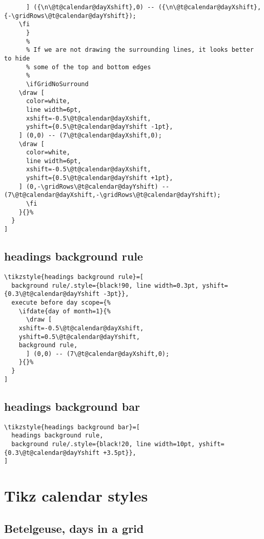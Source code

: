 \documentclass[11pt,oneside]{memoir-article}
\begin{document}
\begin{verbatim}
	  ] ({\n\@t@calendar@dayXshift},0) -- ({\n\@t@calendar@dayXshift},{-\gridRows\@t@calendar@dayYshift});
	\fi
      }
      %
      % If we are not drawing the surrounding lines, it looks better to hide
      % some of the top and bottom edges
      %
      \ifGridNoSurround
	\draw [
	  color=white,
	  line width=6pt,
	  xshift=-0.5\@t@calendar@dayXshift,
	  yshift={0.5\@t@calendar@dayYshift -1pt},
	] (0,0) -- (7\@t@calendar@dayXshift,0);
	\draw [
	  color=white,
	  line width=6pt,
	  xshift=-0.5\@t@calendar@dayXshift,
	  yshift={0.5\@t@calendar@dayYshift +1pt},
	] (0,-\gridRows\@t@calendar@dayYshift) -- (7\@t@calendar@dayXshift,-\gridRows\@t@calendar@dayYshift);
      \fi
    }{}%
  }
]
\end{verbatim}

\subsection{headings background rule}
\label{sec:orgb2f8132}

\begin{verbatim}
\tikzstyle{headings background rule}=[
  background rule/.style={black!90, line width=0.3pt, yshift={0.3\@t@calendar@dayYshift -3pt}},
  execute before day scope={%
    \ifdate{day of month=1}{%
      \draw [
	xshift=-0.5\@t@calendar@dayXshift,
	yshift=0.5\@t@calendar@dayYshift,
	background rule,
      ] (0,0) -- (7\@t@calendar@dayXshift,0);
    }{}%
  }
]
\end{verbatim}

\subsection{headings background bar}
\label{sec:org1969b60}

\begin{verbatim}
\tikzstyle{headings background bar}=[
  headings background rule,
  background rule/.style={black!20, line width=10pt, yshift={0.3\@t@calendar@dayYshift +3.5pt}},
]
\end{verbatim}

\section{Tikz calendar styles}
\label{sec:org4ebf211}
\subsection{Betelgeuse, days in a grid}
\label{sec:org30e4ed6}
\end{document}
